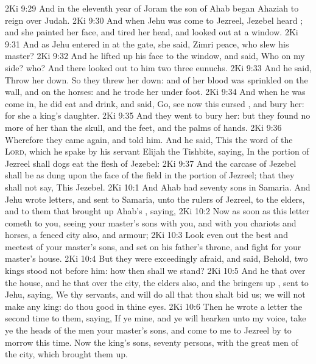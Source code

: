 \vs 2Ki 9:29 And in the eleventh year of Joram the son of Ahab began Ahaziah to reign over Judah.
\vs 2Ki 9:30 And when Jehu was come to Jezreel, Jezebel heard ; and she painted her face, and tired her head, and looked out at a window.
\vs 2Ki 9:31 And as Jehu entered in at the gate, she said,  Zimri peace, who slew his master?
\vs 2Ki 9:32 And he lifted up his face to the window, and said, Who  on my side? who? And there looked out to him two  three eunuchs.
\vs 2Ki 9:33 And he said, Throw her down. So they threw her down: and  of her blood was sprinkled on the wall, and on the horses: and he trode her under foot.
\vs 2Ki 9:34 And when he was come in, he did eat and drink, and said, Go, see now this cursed , and bury her: for she  a king's daughter.
\vs 2Ki 9:35 And they went to bury her: but they found no more of her than the skull, and the feet, and the palms of  hands.
\vs 2Ki 9:36 Wherefore they came again, and told him. And he said, This  the word of the \textsc{Lord}, which he spake by his servant Elijah the Tishbite, saying, In the portion of Jezreel shall dogs eat the flesh of Jezebel:
\vs 2Ki 9:37 And the carcase of Jezebel shall be as dung upon the face of the field in the portion of Jezreel;  that they shall not say, This  Jezebel.
\vs 2Ki 10:1 And Ahab had seventy sons in Samaria. And Jehu wrote letters, and sent to Samaria, unto the rulers of Jezreel, to the elders, and to them that brought up Ahab's , saying,
\vs 2Ki 10:2 Now as soon as this letter cometh to you, seeing your master's sons  with you, and  with you chariots and horses, a fenced city also, and armour;
\vs 2Ki 10:3 Look even out the best and meetest of your master's sons, and set  on his father's throne, and fight for your master's house.
\vs 2Ki 10:4 But they were exceedingly afraid, and said, Behold, two kings stood not before him: how then shall we stand?
\vs 2Ki 10:5 And he that  over the house, and he that  over the city, the elders also, and the bringers up , sent to Jehu, saying, We  thy servants, and will do all that thou shalt bid us; we will not make any king: do thou  good in thine eyes.
\vs 2Ki 10:6 Then he wrote a letter the second time to them, saying, If ye  mine, and  ye will hearken unto my voice, take ye the heads of the men your master's sons, and come to me to Jezreel by to morrow this time. Now the king's sons,  seventy persons,  with the great men of the city, which brought them up.
